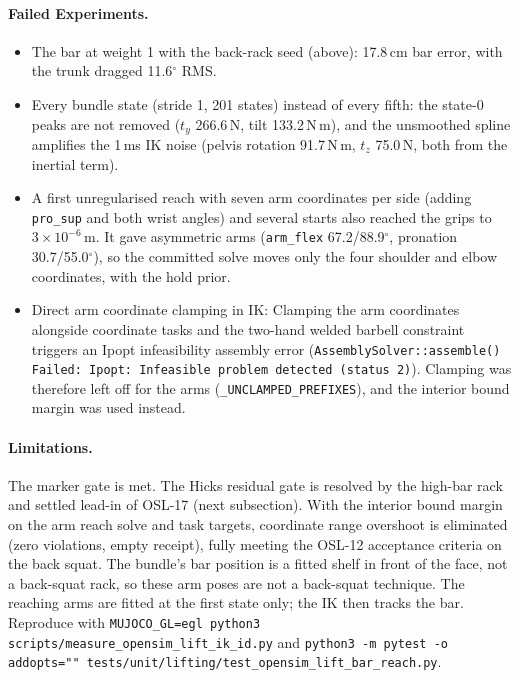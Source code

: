 \documentclass[11pt,a4paper]{article}
\begin{document}
\paragraph{Failed Experiments.}
\begin{itemize}[nosep]
\item The bar at weight 1 with the back-rack seed (above): 17.8\,cm bar
  error, with the trunk dragged 11.6$^\circ$ RMS.
\item Every bundle state (stride 1, 201 states) instead of every fifth: the
  state-0 peaks are not removed ($t_y$ 266.6\,N, tilt 133.2\,N\,m), and the
  unsmoothed spline amplifies the 1\,ms IK noise (pelvis rotation
  91.7\,N\,m, $t_z$ 75.0\,N, both from the inertial term).
\item A first unregularised reach with seven arm coordinates per side
  (adding \texttt{pro\_sup} and both wrist angles) and several starts also
  reached the grips to $3\times10^{-6}$\,m. It gave asymmetric arms
  (\texttt{arm\_flex} 67.2/88.9$^\circ$, pronation 30.7/55.0$^\circ$), so the
  committed solve moves only the four shoulder and elbow coordinates, with
  the hold prior.
\item Direct arm coordinate clamping in IK: Clamping the arm coordinates
  alongside coordinate tasks and the two-hand welded barbell constraint triggers an
  Ipopt infeasibility assembly error (\texttt{AssemblySolver::assemble() Failed:
  Ipopt: Infeasible problem detected (status 2)}). Clamping was therefore left off
  for the arms (\texttt{\_UNCLAMPED\_PREFIXES}), and the interior bound margin was
  used instead.
\end{itemize}

\paragraph{Limitations.} The marker gate is met. The Hicks residual gate is
resolved by the high-bar rack and settled lead-in of OSL-17 (next subsection).
With the interior bound margin on the arm reach solve and task targets,
coordinate range overshoot is eliminated (zero violations, empty receipt),
fully meeting the OSL-12 acceptance criteria on the back squat.
The bundle's bar position is a fitted shelf in front of the face, not a
back-squat rack, so these arm poses are not a back-squat technique. The
reaching arms are fitted at the first state only; the IK then tracks the bar.
Reproduce with \texttt{MUJOCO\_GL=egl python3 scripts/measure\_opensim\_lift\_ik\_id.py}
and \texttt{python3 -m pytest -o addopts="" tests/unit/lifting/test\_opensim\_lift\_bar\_reach.py}.
\end{document}
